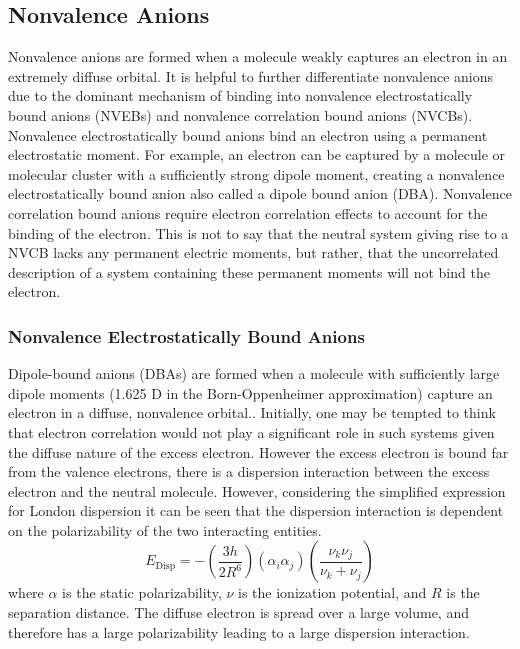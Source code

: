 \subsection{Nonvalence Anions}

Nonvalence anions are formed when a molecule weakly captures an electron in an extremely diffuse orbital.
It is helpful to further differentiate nonvalence anions due to the dominant mechanism of binding into nonvalence electrostatically bound anions (NVEBs) and nonvalence correlation bound anions (NVCBs).
Nonvalence electrostatically bound anions bind an electron using a permanent electrostatic moment.
For example, an electron can be captured by a molecule or molecular cluster with a sufficiently strong dipole moment, creating a nonvalence electrostatically bound anion also called a dipole bound anion (DBA).
Nonvalence correlation bound anions require electron correlation effects to account for the binding of the electron.
This is not to say that the neutral system giving rise to a NVCB lacks any permanent electric moments, but rather, that the uncorrelated description of a system containing these permanent moments will not bind the electron.

\subsubsection{Nonvalence Electrostatically Bound Anions}

Dipole-bound anions (DBAs) are formed when a molecule with sufficiently large dipole moments (1.625 D in the Born-Oppenheimer approximation) capture an electron in a diffuse, nonvalence orbital.\cite{Jordan_Luken_JCP_1976,Gutowski_Jordan_PRA_1996,Barnett_JCP_1988,Fermi_Teller_PhysRev_1947,Turner_Anderson_PhysRev_1968,Crawford_ProcPhysSoc_1967,Garrett_CPL_1970,Garrett_PRA_1971,Lykke_PRL_1984,Desfrancois_Schermann_PRL_1994,Simons_JPCA_2008,Jordan_Wang_Ann_Rev_2003}.
Initially, one may be tempted to think that electron correlation would not play a significant role in such systems given the diffuse nature of the excess electron.
However the excess electron is bound far from the valence electrons, there is a dispersion interaction between the excess electron and the neutral molecule.\cite{Gutowski97,Gutowski98}
However, considering the simplified expression for London dispersion it can be seen that the dispersion interaction is dependent on the polarizability of the two interacting entities.\cite{London1937}
\begin{equation}
	E_{\mathrm{Disp}} = -\left(\frac{3h}{2R^6}\right) \left(\alpha_i \alpha_j \right) \left(\frac{\nu_k \nu_j}{\nu_k + \nu_j} \right)
\end{equation}
where $\alpha$ is the static polarizability, $\nu$ is the ionization potential, and $R$ is the separation distance.
The diffuse electron is spread over a large volume, and therefore has a large polarizability leading to a large dispersion interaction.


